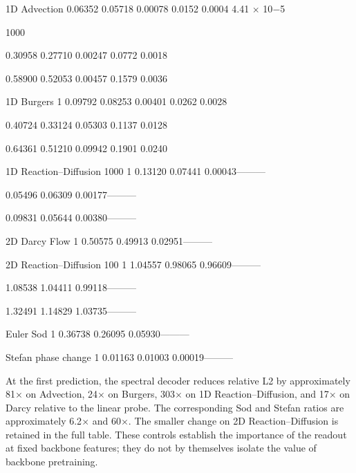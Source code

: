 \documentclass[11pt]{article}
\begin{document}
\noindent 1D Advection 0.06352 0.05718 0.00078 0.0152 0.0004 4.41 \ensuremath{\times} 10\ensuremath{-}5\par

1000

 0.30958 0.27710 0.00247 0.0772 0.0018\par


 0.58900 0.52053 0.00457 0.1579 0.0036\par


\noindent 1D Burgers 1 0.09792 0.08253 0.00401 0.0262 0.0028\par


 0.40724 0.33124 0.05303 0.1137 0.0128\par


 0.64361 0.51210 0.09942 0.1901 0.0240\par


\noindent 1D Reaction–Diffusion 1000 1 0.13120 0.07441 0.00043\quad —\quad —\quad —\par


 0.05496 0.06309 0.00177\quad —\quad —\quad —\par


 0.09831 0.05644 0.00380\quad —\quad —\quad —\par


\noindent 2D Darcy Flow 1 0.50575 0.49913 0.02951\quad —\quad —\quad —\par


\noindent 2D Reaction–Diffusion 100 1 1.04557 0.98065 0.96609\quad —\quad —\quad —\par


 1.08538 1.04411 0.99118\quad —\quad —\quad —\par


 1.32491 1.14829 1.03735\quad —\quad —\quad —\par


\noindent Euler Sod 1 0.36738 0.26095 0.05930\quad —\quad —\quad —\par


\noindent Stefan phase change 1 0.01163 0.01003 0.00019\quad —\quad —\quad —\par

At the first prediction, the spectral decoder reduces relative L2 by approximately 81\ensuremath{\times} on
Advection, 24\ensuremath{\times} on Burgers, 303\ensuremath{\times} on 1D Reaction–Diffusion, and 17\ensuremath{\times} on Darcy relative
to the linear probe. The corresponding Sod and Stefan ratios are approximately 6.2\ensuremath{\times} and
60\ensuremath{\times}. The smaller change on 2D Reaction–Diffusion is retained in the full table. These
controls establish the importance of the readout at fixed backbone features; they do not by
themselves isolate the value of backbone pretraining.
\end{document}
